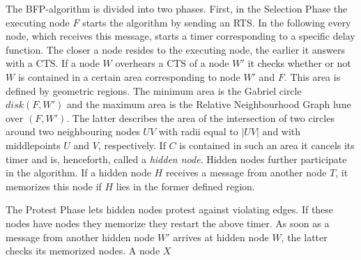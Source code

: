 The BFP-algorithm is divided into two phases.
First, in the Selection Phase the executing node $F $ starts the algorithm by sending an RTS. 
In the following every node, which receives this message, starts a timer corresponding to a specific delay function.
The closer a node resides to the executing node, the earlier it answers with a CTS. 
If a node $W $ overhears a CTS of a node $W' $ it checks whether or not $W $ is contained in a certain area corresponding to node $W' $ and $F $.
This area is defined by geometric regions.
The minimum area is the Gabriel circle $disk(F, W') $ and the maximum area is the Relative Neighbourhood Graph lune over $(F,W') $.
The latter describes the area of the intersection of two circles around two neighbouring nodes $UV $ with radii equal to $|UV| $ and with middlepoints $U $ and $V $, respectively.
If $C $ is contained in such an area it cancels its timer and is, henceforth, called a \emph{hidden node}.
Hidden nodes further participate in the algorithm.
If a hidden node $H $ receives a message from another node $T $, it memorizes this node if $H $ lies in the former defined region. 

The Protest Phase lets hidden nodes protest against violating edges.
If these nodes have nodes they memorize they restart the above timer.
As soon as a message from another hidden node $W' $ arrives at hidden node $W $, the latter checks its memorized nodes.
A node $X $ 

